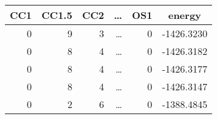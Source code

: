 \begin{tabular}{|rrrrr|c|}
    \hline
     CC1 &  CC1.5 &  CC2 & \dots & OS1 &     energy \\
    \hline
       0 &      9 &    3 & \dots &  0 & -1426.3230 \\
       0 &      8 &    4 & \dots &  0 & -1426.3182 \\
       0 &      8 &    4 & \dots &  0 & -1426.3177 \\
       0 &      8 &    4 & \dots &  0 & -1426.3147 \\
       0 &      2 &    6 & \dots &  0 & -1388.4845 \\
    \hline
\end{tabular}
